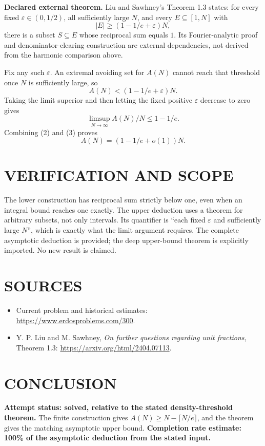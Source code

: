 \textbf{Declared external theorem.} Liu and Sawhney's Theorem 1.3 states: for every fixed $\varepsilon\in(0,1/2)$, all sufficiently large $N$, and every $E\subseteq[1,N]$ with
\[
|E|\geq(1-1/e+\varepsilon)N,
\]
there is a subset $S\subseteq E$ whose reciprocal sum equals $1$. Its Fourier-analytic proof and denominator-clearing construction are external dependencies, not derived from the harmonic comparison above.

Fix any such $\varepsilon$. An extremal avoiding set for $A(N)$ cannot reach that threshold once $N$ is sufficiently large, so
\[
A(N)<(1-1/e+\varepsilon)N.
\]
Taking the limit superior and then letting the fixed positive $\varepsilon$ decrease to zero gives
\[
\limsup_{N\to\infty}A(N)/N\leq1-1/e.
\tag{3}
\]
Combining (2) and (3) proves
\[
A(N)=(1-1/e+o(1))N.
\]

\section{VERIFICATION AND SCOPE}
The lower construction has reciprocal sum strictly below one, even when an integral bound reaches one exactly. The upper deduction uses a theorem for arbitrary subsets, not only intervals. Its quantifier is ``each fixed $\varepsilon$ and sufficiently large $N$'', which is exactly what the limit argument requires. The complete asymptotic deduction is provided; the deep upper-bound theorem is explicitly imported. No new result is claimed.

\section{SOURCES}
\begin{itemize}
\item Current problem and historical estimates: \url{https://www.erdosproblems.com/300}.
\item Y. P. Liu and M. Sawhney, \emph{On further questions regarding unit fractions}, Theorem 1.3: \url{https://arxiv.org/html/2404.07113}.
\end{itemize}
\section{CONCLUSION}
\textbf{Attempt status: solved, relative to the stated density-threshold theorem.}
The finite construction gives $A(N)\geq N-\lceil N/e\rceil$, and the theorem gives the matching asymptotic upper bound.
\textbf{Completion rate estimate: 100\% of the asymptotic deduction from the stated input.}
